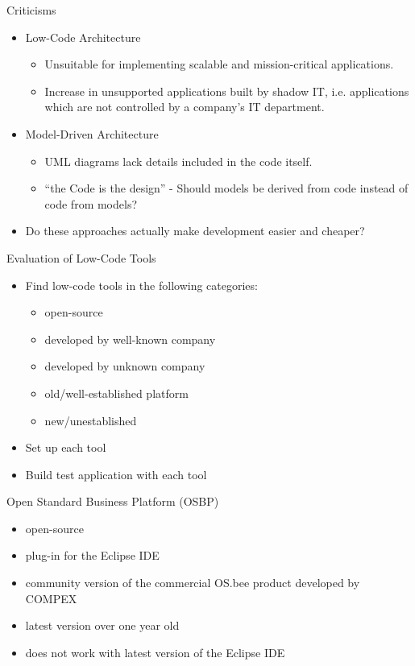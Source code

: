 \documentclass[aspectratio=169]{beamer}
\begin{document}
  \begin{frame}{Criticisms}
    \begin{itemize}
      \item Low-Code Architecture
        \begin{itemize}
          \item Unsuitable for implementing scalable and mission-critical applications.
          \item Increase in unsupported applications built by shadow IT,
                i.e. applications which are not controlled by a company's IT department.
        \end{itemize}
      \item Model-Driven Architecture
        \begin{itemize}
          \item UML diagrams lack details included in the code itself.
          \item “the Code is the design” - Should models be derived from code instead of code from models?
        \end{itemize}
      \item Do these approaches actually make development easier and cheaper?
    \end{itemize}
  \end{frame}

  \begin{frame}{Evaluation of Low-Code Tools}
    \begin{itemize}
      \item Find low-code tools in the following categories:
          \begin{itemize}
            \item open-source
            \item developed by well-known company
            \item developed by unknown company
            \item old/well-established platform
            \item new/unestablished
          \end{itemize}
      \item Set up each tool
      \item Build test application with each tool
    \end{itemize}
  \end{frame}

  \begin{frame}{Open Standard Business Platform (OSBP)}
    \begin{itemize}
      \item open-source
      \item plug-in for the Eclipse IDE
      \item community version of the commercial OS.bee product developed by COMPEX
      \item latest version over one year old
      \item does not work with latest version of the Eclipse IDE
    \end{itemize}
  \end{frame}
\end{document}
